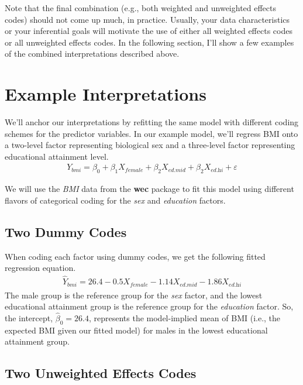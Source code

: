 \documentclass{article}\usepackage[]{graphicx}\usepackage[]{color}
\begin{document}
Note that the final combination (e.g., both weighted and unweighted effects
codes) should not come up much, in practice. Usually, your data characteristics
or your inferential goals will motivate the use of either all weighted effects
codes or all unweighted effects codes. In the following section, I'll show a few
examples of the combined interpretations described above.

\section{Example Interpretations}

We'll anchor our interpretations by refitting the same model with different
coding schemes for the predictor variables. In our example model, we'll regress
BMI onto a two-level factor representing biological sex and a three-level factor
representing educational attainment level.
\begin{align*}
  Y_{\textit{bmi}} = 
  \beta_0 + 
  \beta_1X_{\textit{female}} + 
  \beta_2X_{\textit{ed.mid}} + 
  \beta_2X_{\textit{ed.hi}} + 
  \varepsilon
\end{align*}

We will use the \emph{BMI} data from the \textbf{wec} package \citep{wec} to fit
this model using different flavors of categorical coding for the \emph{sex} and
\emph{education} factors.

\subsection{Two Dummy Codes}



When coding each factor using dummy codes, we get the following fitted
regression equation.
\begin{align*}
  \hat{Y}_{\textit{bmi}} = 
  26.4 
  -0.5X_{\textit{female}} 
  -1.14X_{\textit{ed.mid}} 
  -1.86X_{\textit{ed.hi}}
\end{align*}
The male group is the reference group for the \emph{sex} factor, and the lowest
educational attainment group is the reference group for the \emph{education}
factor. So, the intercept, $\hat{\beta}_0 = 26.4$,
represents the model-implied mean of BMI (i.e., the expected BMI given our
fitted model) for males in the lowest educational attainment group.

\subsection{Two Unweighted Effects Codes}
\end{document}
